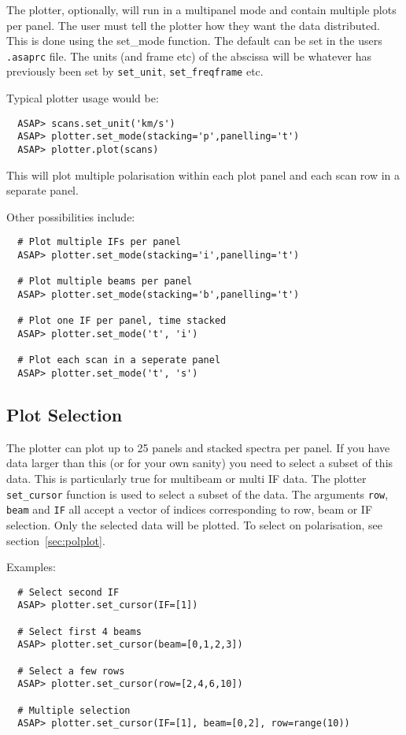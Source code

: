\documentclass[11pt]{article}
\newcommand{\cmd}[1]{{\tt #1}}
\begin{document}
The plotter, optionally, will run in a multipanel mode and contain
multiple plots per panel. The user must tell the plotter how they want
the data distributed. This is done using the set\_mode function. The
default can be set in the users {\tt .asaprc} file. The units (and frame
etc) of the abscissa will be whatever has previously been set by
\cmd{set\_unit}, \cmd{set\_freqframe} etc.

Typical plotter usage would be:

\begin{verbatim}
  ASAP> scans.set_unit('km/s')
  ASAP> plotter.set_mode(stacking='p',panelling='t')
  ASAP> plotter.plot(scans)
\end{verbatim}

This will plot multiple polarisation within each plot panel and each
scan row in a separate panel.

Other possibilities include:

\begin{verbatim}
  # Plot multiple IFs per panel
  ASAP> plotter.set_mode(stacking='i',panelling='t')

  # Plot multiple beams per panel
  ASAP> plotter.set_mode(stacking='b',panelling='t')

  # Plot one IF per panel, time stacked
  ASAP> plotter.set_mode('t', 'i')

  # Plot each scan in a seperate panel
  ASAP> plotter.set_mode('t', 's')

\end{verbatim}

\subsection{Plot Selection}
\label{sec:plotter_cursor}

The plotter can plot up to 25 panels and stacked spectra per
panel. If you have data larger than this (or for your own sanity) you
need to select a subset of this data. This is particularly true for
multibeam or multi IF data. The plotter \cmd{set\_cursor} function is
used to select a subset of the data. The arguments \cmd{row},
\cmd{beam} and \cmd{IF} all accept a vector of indices corresponding
to row, beam or IF selection. Only the selected data will be plotted.
To select on polarisation, see section~\ref{sec:polplot}.

Examples:

\begin{verbatim}
  # Select second IF
  ASAP> plotter.set_cursor(IF=[1])

  # Select first 4 beams
  ASAP> plotter.set_cursor(beam=[0,1,2,3])

  # Select a few rows
  ASAP> plotter.set_cursor(row=[2,4,6,10])

  # Multiple selection
  ASAP> plotter.set_cursor(IF=[1], beam=[0,2], row=range(10))
\end{verbatim}
\end{document}
